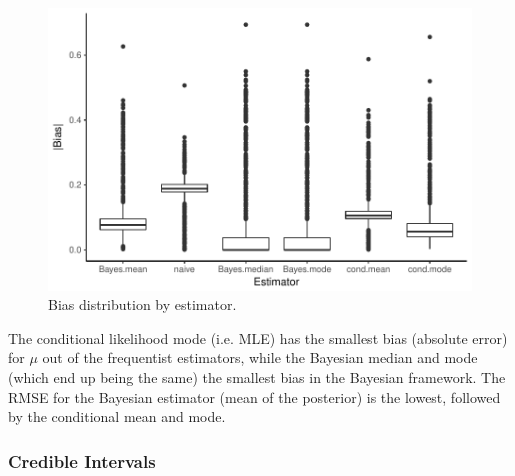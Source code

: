 \documentclass[AMA,STIX1COL]{WileyNJD-v2}\usepackage[]{graphicx}\usepackage[]{color}
\newenvironment{knitrout}{}{} %
\begin{document}
\begin{figure}
\caption{Bias distribution by estimator.}
\begin{knitrout}
\color{fgcolor}

{\centering \includegraphics[width=6in]{figure/fig1-1} 

}



\end{knitrout}
\end{figure}


The conditional likelihood mode (i.e. MLE) has the smallest bias (absolute error) for $\mu$ out of the frequentist estimators, while the Bayesian median and mode (which end up being the same) the smallest bias in the Bayesian framework. The RMSE for the Bayesian estimator (mean of the posterior) is the lowest, followed by the conditional mean and mode.

\subsubsection{Credible Intervals}
\end{document}

